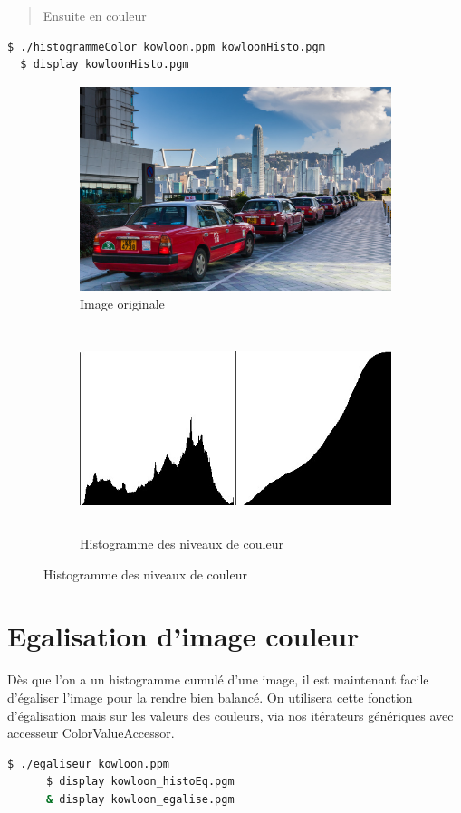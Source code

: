\documentclass[a4paper,10pt]{article}
\begin{document}
    \begin{quote}
    Ensuite en couleur
    \end{quote}
    \begin{lstlisting}[language=Bash]
  $ ./histogrammeColor kowloon.ppm kowloonHisto.pgm     
  $ display kowloonHisto.pgm
  \end{lstlisting}
  \begin{figure}[h]
   \begin{subfigure}{1\textwidth}
    \centering
    \includegraphics[width=0.8\linewidth, height=6cm]{kowloon}
    \caption{Image originale}
    \label{fig:kowloonO}
    \end{subfigure}
     \begin{subfigure}{1\textwidth}
    \centering
    \includegraphics[width=1\linewidth, height=6cm]{kowloonHisto}   
    \caption{Histogramme des niveaux de couleur}
    \label{fig:kowloonHisto}
    \end{subfigure}
    \end{figure}

    \pagebreak
    \section{Egalisation d'image couleur}
    Dès que l'on a un histogramme cumulé d'une image, il est maintenant facile d'égaliser l'image pour la rendre bien balancé. On utilisera cette fonction d'égalisation mais sur les valeurs des couleurs, via nos itérateurs génériques avec accesseur ColorValueAccessor. 
    \begin{lstlisting}[language=Bash]
      $ ./egaliseur kowloon.ppm    
      $ display kowloon_histoEq.pgm
      & display kowloon_egalise.pgm
    \end{lstlisting}
\end{document}
